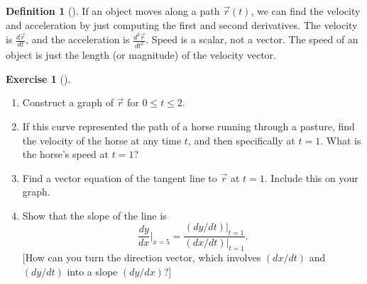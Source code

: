 \documentclass[10pt,]{book}
\theoremstyle{plain}
\theoremstyle{definition}
\newtheorem{definition}[theorem]{Definition}
\theoremstyle{definition}
\theoremstyle{definition}
\theoremstyle{definition}
\newtheorem{exploration}[project]{Exercise}
\theoremstyle{definition}
\numberwithin{equation}{section}
\newcommand{\ds}{\displaystyle}
\begin{document}
\begin{definition}[{}]\label{def_velocity_acceleration}
If an object moves along a path \(\vec r(t)\), we can find the velocity and acceleration by just computing the first and second derivatives. The velocity is \(\frac{d\vec r}{dt}\), and the acceleration is \(\frac{d^2\vec r}{dt^2}\). Speed is a scalar, not a vector. The speed of an object is just the length (or magnitude) of the velocity vector.%
\end{definition}
\begin{exploration}[]\label{exploration-79}
\leavevmode%
\begin{enumerate}[font=\bfseries,label=(\alph*),ref=\alph*]
\item\label{task-128} Construct a graph of \(\vec r\) for \(0\leq t\leq 2\).%
\item\label{task-129} If this curve represented the path of a horse running through a pasture, find the velocity of the horse at any time \(t\), and then specifically at \(t=1\). What is the horse's speed at \(t=1\)?%
\item\label{task-130} Find a vector equation of the tangent line to \(\vec r\) at \(t=1\).  Include this on your graph.%
\item\label{task-131} Show that the slope of the line is%
\begin{equation*}
\ds \frac{dy}{dx}\big|_{x=5} 
= 
\frac{
(dy/dt)\big|_{t=1}
}{
(dx/dt)\big|_{t=1}
}.
\end{equation*}
[How can you turn the direction vector, which involves \((dx/dt)\) and \((dy/dt)\) into a slope \((dy/dx)\)?]%
\end{enumerate}
\end{exploration}
\typeout{************************************************}
\typeout{************************************************}
\end{document}
